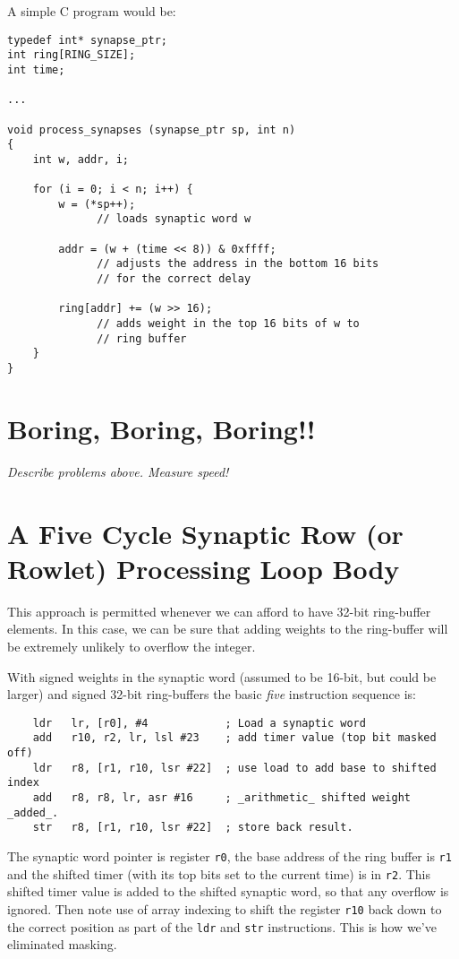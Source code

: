 A simple C program would be:
\begin{verbatim}
typedef int* synapse_ptr;
int ring[RING_SIZE];
int time;

...

void process_synapses (synapse_ptr sp, int n)
{
    int w, addr, i;

    for (i = 0; i < n; i++) {
        w = (*sp++);
              // loads synaptic word w

        addr = (w + (time << 8)) & 0xffff;
              // adjusts the address in the bottom 16 bits
              // for the correct delay

        ring[addr] += (w >> 16);
              // adds weight in the top 16 bits of w to
              // ring buffer
    }
}
\end{verbatim}

\section{Boring, Boring, Boring!!}

{\em Describe problems above. Measure speed!}

\section{A Five Cycle Synaptic Row (or Rowlet) Processing Loop Body}

This approach is permitted whenever we can afford to have 32-bit
ring-buffer elements. In this case, we can be sure that adding weights
to the ring-buffer will be extremely unlikely to overflow the integer.

With signed weights in the synaptic word (assumed to be 16-bit, but
could be larger) and signed 32-bit ring-buffers the basic {\em
  five} instruction sequence is:
\begin{verbatim}
    ldr   lr, [r0], #4            ; Load a synaptic word
    add   r10, r2, lr, lsl #23    ; add timer value (top bit masked off)
    ldr   r8, [r1, r10, lsr #22]  ; use load to add base to shifted index
    add   r8, r8, lr, asr #16     ; _arithmetic_ shifted weight _added_.
    str   r8, [r1, r10, lsr #22]  ; store back result.
\end{verbatim}
The synaptic word pointer is register {\tt r0}, the base address of
the ring buffer is {\tt r1} and the shifted timer (with its top bits
set to the current time) is in {\tt r2}.
This shifted timer value is added to the shifted synaptic word, so that any
overflow is ignored. Then note use of array indexing to shift the
register {\tt r10} back down to the correct position as part of the
{\tt ldr} and {\tt str} instructions. This is how we've eliminated
masking.

